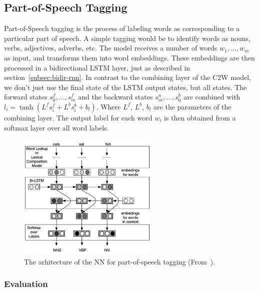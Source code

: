 \subsection{Part-of-Speech Tagging}

Part-of-Speech tagging is the process of labeling words as corresponding to a particular part of speech. A simple tagging would be
to identify words as nouns, verbs, adjectives, adverbs, etc.
The model receives a number of words $w_1,\dots,w_m$ as input, and transforms them into word embeddings. These embeddings are then processed
in a bidirectional LSTM layer, just as described in section~\ref{subsec:bidir-rnn}. 
In contrast to the combining layer of the C2W model, we don't just use the final state of the LSTM output states, but all states.
The forward states $s^f_0,\dots,s^f_m$ and the backward states  $s^n_m,\dots,s^b_0$ are combined with  $l_i = \tanh(L^f s_i^f + L^b s^b_i + b_l)$.
Where $L^f$, $L^b$, $b_l$ are the parameters of the combining layer. The output label for each word $w_i$ is then obtained from a softmax layer over
all word labels.

\begin{figure}[H]
\begin{center}
  \includegraphics[width=0.6\textwidth]{./img/part-of-speech}
  \caption{The arhitecture of the NN for part-of-speech tagging (From~\cite{DBLP:journals/corr/LingLMAADBT15}).}
  \label{fig:c2w-language-model}
\end{center}
\end{figure}

\subsubsection{Evaluation}

